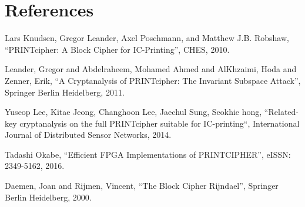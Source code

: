 \documentclass[journal=tosc,preprint]{iacrtrans}
\begin{document}
\section{References}

\begin{enumerate}[label={[\arabic*]}]
	
	\item Lars Knudsen, Gregor Leander, Axel Poschmann, and Matthew J.B. Robshaw, “PRINTcipher: A Block Cipher for IC-Printing”, CHES,  2010.
	
	\item Leander, Gregor and Abdelraheem, Mohamed Ahmed and AlKhzaimi, Hoda and Zenner, Erik, “A Cryptanalysis of PRINTcipher: The Invariant Subspace Attack”, Springer Berlin Heidelberg, 2011.
	
	\item Yuseop Lee, Kitae Jeong, Changhoon Lee, Jaechul Sung, Seokhie hong, “Related-key cryptanalysis on the full PRINTcipher suitable for IC-printing“, International Journal of Distributed Sensor Networks, 2014.
	
	\item Tadashi Okabe, “Efficient FPGA Implementations of PRINTCIPHER”, eISSN: 2349-5162, 2016.
	
	\item Daemen, Joan and Rijmen, Vincent, “The Block Cipher Rijndael”, Springer Berlin Heidelberg, 2000.
	
\end{enumerate}
%
%
\end{document}
